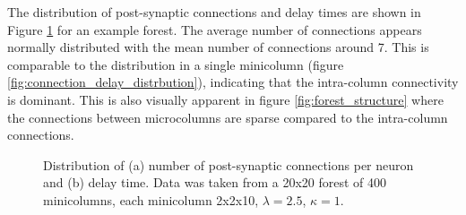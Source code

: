 The distribution of post-synaptic connections and delay times are shown in Figure \ref{fig:connection_delay_distrbution_forest} for an example forest.
The average number of connections appears normally distributed with the mean  number of connections around 7.
This is comparable to the distribution in a single minicolumn (figure \ref{fig:connection_delay_distrbution}),
indicating that the intra-column connectivity is dominant. 
This is also visually apparent in figure \ref{fig:forest_structure} where the connections between microcolumns are sparse compared to the intra-column connections.
\begin{figure}[!htb]
 \caption{Distribution of (a) number of post-synaptic connections per neuron and (b) delay time. Data was taken from a 20x20 forest of 400 minicolumns, each minicolumn 2x2x10, $\lambda=2.5$, $\kappa=1$.  } 
 \label{fig:connection_delay_distrbution_forest}
\end{figure}
 \FloatBarrier

